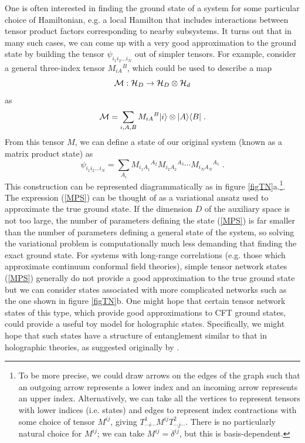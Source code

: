 \documentclass[12pt,epsf]{article}
\newcommand{\be}{\begin{equation}}
\newcommand{\ee}{\end{equation}}
\begin{document}
One is often interested in finding the ground state of a system for some particular choice of Hamiltonian, e.g. a local Hamilton that includes interactions between tensor product factors corresponding to nearby subsystems. It turns out that in many such cases, we can come up with a very good approximation to the ground state by building the tensor $\psi_{i_1 i_2 \dots i_N}$ out of simpler tensors. For example, consider a general three-index tensor $M_{i A}{}^B$, which could be used to describe a map
\be
{\cal M} : {\cal H}_D \to {\cal H}_D \otimes {\cal H}_d
\ee
as
\be
{\cal M} = \sum_{i,A,B} M_{i A}{}^B |i \rangle \otimes |A \rangle \langle B| \; .
\ee
From this tensor $M$, we can define a state of our original system (known as a matrix product state) as
\be
\label{MPS}
\psi_{i_1 i_2 \dots i_N} = \sum_{A_i} M_{i_1 A_1}{}^{A_2} M_{i_2 A_2}{}^{A_3} \cdots M_{i_N A_N}{}^{A_1} \; .
\ee
This construction can be represented diagrammatically as in figure \ref{figTN}a.\footnote{To be more precise, we could draw arrows on the edges of the graph such that an outgoing arrow represents a lower index and an incoming arrow represents an upper index. Alternatively, we can take all the vertices to represent tensors with lower indices (i.e. states) and edges to represent index contractions with some choice of tensor $M^{ij}$, giving $T^1_{\cdots i \cdots} M^{ij} T^2_{\cdots j \cdots}$. There is no particularly natural choice for $M^{ij}$; we can take $M^{ij} = \delta^{ij}$, but this is basis-dependent.}. The expression (\ref{MPS}) can be thought of as a variational ansatz used to approximate the true ground state. If the dimension $D$ of the auxiliary space is not too large, the number of parameters defining the state (\ref{MPS}) is far smaller than the number of parameters defining a general state of the system, so solving the variational problem is computationally much less demanding that finding the exact ground state. For systems with long-range correlations (e.g. those which approximate continuum conformal field theories), simple tensor network states (\ref{MPS}) generally do not provide a good approximation to the true ground state but we can consider states associated with more complicated networks such as the one shown in figure \ref{figTN}b. One might hope that certain tensor network states of this type, which provide good approximations to CFT ground states, could provide a useful toy model for holographic states. Specifically, we might hope that such states have a structure of entanglement similar to that in holographic theories, as suggested originally by \cite{Swingle:2009bg}.
\end{document}
